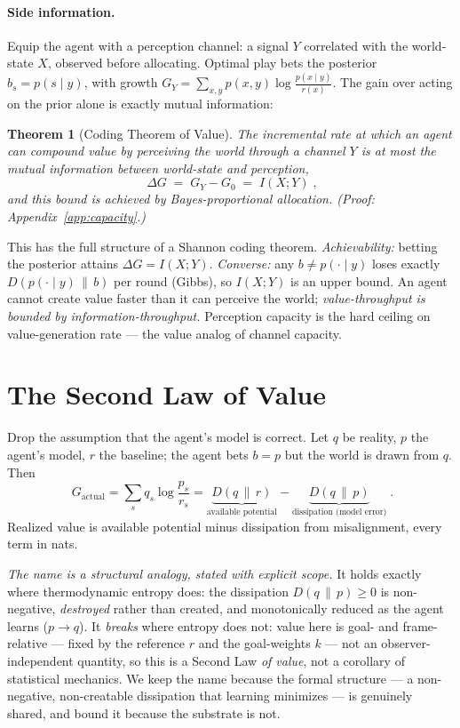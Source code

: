 \documentclass[11pt]{article}
\theoremstyle{plain}
\newtheorem{theorem}{Theorem}
\theoremstyle{definition}
\theoremstyle{remark}
\newcommand{\KL}[2]{D\!\left(#1\,\|\,#2\right)}
\newcommand{\I}{I}
\begin{document}
\paragraph{Side information.} Equip the agent with a perception channel: a signal $Y$ correlated with the
world-state $X$, observed before allocating. Optimal play bets the posterior $b_s=p(s\mid y)$, with growth
$G_Y=\sum_{x,y}p(x,y)\log\frac{p(x\mid y)}{r(x)}$. The gain over acting on the prior alone is exactly mutual
information:
\begin{theorem}[Coding Theorem of Value]\label{thm:capacity}
The incremental rate at which an agent can compound value by perceiving the world through a channel $Y$ is at
most the mutual information between world-state and perception,
\begin{equation}
\boxed{\;\Delta G \;=\; G_Y-G_0 \;=\; \I(X;Y)\;,}
\end{equation}
and this bound is achieved by Bayes-proportional allocation. \textup{(Proof: Appendix~\ref{app:capacity}.)}
\end{theorem}
\noindent This has the full structure of a Shannon coding theorem. \emph{Achievability:} betting the posterior
attains $\Delta G=\I(X;Y)$. \emph{Converse:} any $b\ne p(\cdot\mid y)$ loses exactly $\KL{p(\cdot\mid y)}{b}$ per
round (Gibbs), so $\I(X;Y)$ is an upper bound. An agent cannot create value faster than it can perceive the
world; \emph{value-throughput is bounded by information-throughput.} Perception capacity is the hard ceiling on
value-generation rate --- the value analog of channel capacity.

\section{The Second Law of Value}\label{sec:secondlaw}

Drop the assumption that the agent's model is correct. Let $q$ be reality, $p$ the agent's model, $r$ the
baseline; the agent bets $b=p$ but the world is drawn from $q$. Then
\begin{equation}\label{eq:secondlaw}
\boxed{\;G_{\mathrm{actual}}=\sum_s q_s\log\frac{p_s}{r_s}
=\underbrace{\KL{q}{r}}_{\text{available potential}}-\underbrace{\KL{q}{p}}_{\text{dissipation (model error)}}\;.}
\end{equation}
Realized value is available potential minus dissipation from misalignment, every term in nats.

\emph{The name is a structural analogy, stated with explicit scope.} It holds exactly where thermodynamic
entropy does: the dissipation $\KL{q}{p}\ge 0$ is non-negative, \emph{destroyed} rather than created, and
monotonically reduced as the agent learns ($p\to q$). It \emph{breaks} where entropy does not: value here is
goal- and frame-relative --- fixed by the reference $r$ and the goal-weights $k$ --- not an observer-independent
quantity, so this is a Second Law \emph{of value}, not a corollary of statistical mechanics. We keep the name
because the formal structure --- a non-negative, non-creatable dissipation that learning minimizes --- is
genuinely shared, and bound it because the substrate is not.
\end{document}
